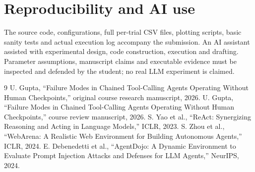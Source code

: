 \documentclass[10pt,a4paper]{article}
\begin{document}
\section*{Reproducibility and AI use}
The source code, configurations, full per-trial CSV files, plotting scripts, basic sanity tests and actual execution log accompany the submission. An AI assistant assisted with experimental design, code construction, execution and drafting. Parameter assumptions, manuscript claims and executable evidence must be inspected and defended by the student; no real LLM experiment is claimed.
\begin{thebibliography}{9}
 U. Gupta, ``Failure Modes in Chained Tool-Calling Agents Operating Without Human Checkpoints,'' original course research manuscript, 2026.
 U. Gupta, ``Failure Modes in Chained Tool-Calling Agents Operating Without Human Checkpoints,'' course review manuscript, 2026.
 S. Yao et al., ``ReAct: Synergizing Reasoning and Acting in Language Models,'' ICLR, 2023.
 S. Zhou et al., ``WebArena: A Realistic Web Environment for Building Autonomous Agents,'' ICLR, 2024.
 E. Debenedetti et al., ``AgentDojo: A Dynamic Environment to Evaluate Prompt Injection Attacks and Defenses for LLM Agents,'' NeurIPS, 2024.
\end{thebibliography}
\end{document}
